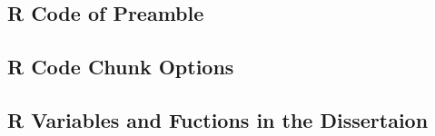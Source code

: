 \documentclass[a4paper,12pt,times,numbered,print,index]{Classes/PhDThesisPSnPDF}
\begin{document}

\begin{appendices} %
\chapter{R Code of Preamble}
\section{R Code Chunk Options}
\section{R Variables and Fuctions in the Dissertaion}
\end{appendices}



\printthesisindex %
\end{document}
